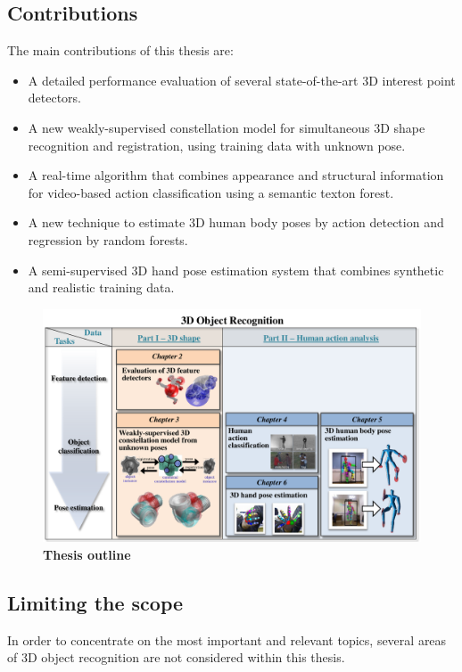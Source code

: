 \subsection{Contributions}

The main contributions of this thesis are:
\begin{itemize}
	\item A detailed performance evaluation of several state-of-the-art 3D interest point detectors.
	\item A new weakly-supervised constellation model for simultaneous 3D shape recognition and registration, using training data with unknown pose. 
	\item A real-time algorithm that combines appearance and structural information for video-based action classification using a semantic texton forest. 
	\item A new technique to estimate 3D human body poses by action detection and regression by random forests. 
	\item A semi-supervised 3D hand pose estimation system that combines synthetic and realistic training data. 
\end{itemize}

\begin{figure}[t]
\centering
\includegraphics[width=1\linewidth]{./fig/intro/intro.pdf}
\caption{\textbf{Thesis outline}} 
\label{fig/intro/outline}
\end{figure}

\subsection{Limiting the scope}

In order to concentrate on the most important and relevant topics, several areas of 3D object recognition are not considered within this thesis. 

